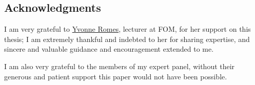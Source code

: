 \subsection{Acknowledgments}

I am very grateful to \href{https://www.linkedin.com/in/yvonne-romes/}{Yvonne Romes}, lecturer at FOM, for her support on this thesis; I am extremely thankful and indebted to her for sharing expertise, and sincere and valuable guidance and encouragement extended to me.

I am also very grateful to the members of my expert panel, without their generous and patient support this paper would not have been possible.

